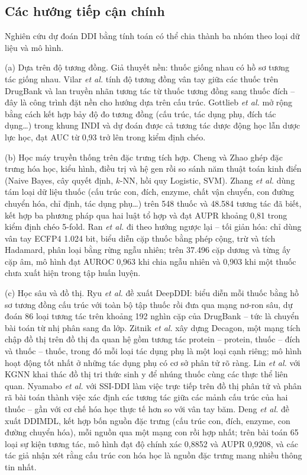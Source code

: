 \documentclass[12pt,a4paper,oneside]{report}
\begin{document}
\subsection{Các hướng tiếp cận chính}
Nghiên cứu dự đoán DDI bằng tính toán có thể chia thành ba nhóm theo loại dữ
liệu và mô hình.

(a) Dựa trên độ tương đồng. Giả thuyết nền: thuốc giống nhau có hồ sơ
tương tác giống nhau. Vilar \textit{et al.} \cite{vilar2012} tính độ tương đồng
vân tay giữa các thuốc trên DrugBank và lan truyền nhãn tương tác từ thuốc
tương đồng sang thuốc đích -- đây là công trình đặt nền cho hướng dựa trên cấu
trúc. Gottlieb \textit{et al.} \cite{gottlieb2012} mở rộng bằng cách kết hợp bảy
độ đo tương đồng (cấu trúc, tác dụng phụ, đích tác dụng\dots) trong khung INDI
và dự đoán được cả tương tác dược động học lẫn dược lực học, đạt AUC từ 0,93 trở
lên trong kiểm định chéo.

(b) Học máy truyền thống trên đặc trưng tích hợp. Cheng và Zhao
\cite{cheng2014} ghép đặc trưng hóa học, kiểu hình, điều trị và hệ gen rồi so
sánh năm thuật toán kinh điển (Naive Bayes, cây quyết định, $k$-NN, hồi quy
Logistic, SVM). Zhang \textit{et al.} \cite{zhang2017} dùng tám loại dữ liệu
thuốc (cấu trúc con, đích, enzyme, chất vận chuyển, con đường chuyển hóa, chỉ
định, tác dụng phụ\dots) trên 548 thuốc và 48.584 tương tác đã biết, kết hợp ba
phương pháp qua hai luật tổ hợp và đạt AUPR khoảng 0,81 trong kiểm định chéo
5-fold. Ran \textit{et al.} \cite{ran2022} đi theo hướng ngược lại -- tối giản
hóa: chỉ dùng vân tay ECFP4 1.024 bit, biểu diễn cặp thuốc bằng phép cộng, trừ
và tích Hadamard, phân loại bằng rừng ngẫu nhiên; trên 37.496 cặp dương và từng
ấy cặp âm, mô hình đạt AUROC 0,963 khi chia ngẫu nhiên và 0,903 khi một thuốc
chưa xuất hiện trong tập huấn luyện.

(c) Học sâu và đồ thị. Ryu \textit{et al.} \cite{ryu2018} đề xuất
DeepDDI: biểu diễn mỗi thuốc bằng hồ sơ tương đồng cấu trúc với toàn bộ tập
thuốc rồi đưa qua mạng nơ-ron sâu, dự đoán 86 loại tương tác trên khoảng 192
nghìn cặp của DrugBank -- tức là chuyển bài toán từ nhị phân sang đa lớp.
Zitnik \textit{et al.} \cite{zitnik2018} xây dựng Decagon, một mạng tích chập
đồ thị trên đồ thị đa quan hệ gồm tương tác protein -- protein, thuốc -- đích và
thuốc -- thuốc, trong đó mỗi loại tác dụng phụ là một loại cạnh riêng; mô hình
hoạt động tốt nhất ở những tác dụng phụ có cơ sở phân tử rõ ràng. Lin
\textit{et al.} \cite{lin2020} với KGNN khai thác đồ thị tri thức sinh y để
nhúng thuốc cùng các thực thể liên quan. Nyamabo \textit{et al.}
\cite{nyamabo2021} với SSI-DDI làm việc trực tiếp trên đồ thị phân tử và
phân rã bài toán thành việc xác định các tương tác giữa các mảnh cấu trúc
của hai thuốc -- gần với cơ chế hóa học thực tế hơn so với vân tay băm. Deng
\textit{et al.} \cite{deng2020} đề xuất DDIMDL, kết hợp bốn nguồn đặc trưng
(cấu trúc con, đích, enzyme, con đường chuyển hóa), mỗi nguồn qua một mạng con
rồi hợp nhất; trên bài toán 65 loại sự kiện tương tác, mô hình đạt độ chính xác
0,8852 và AUPR 0,9208, và các tác giả nhận xét rằng cấu trúc con hóa học
là nguồn đặc trưng mang nhiều thông tin nhất.
\end{document}
